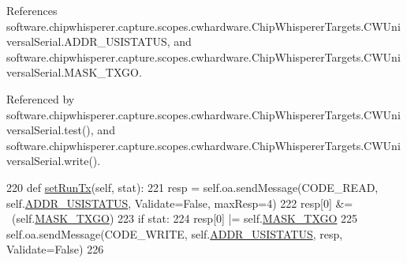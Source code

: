 References software.\+chipwhisperer.\+capture.\+scopes.\+cwhardware.\+Chip\+Whisperer\+Targets.\+C\+W\+Universal\+Serial.\+A\+D\+D\+R\+\_\+\+U\+S\+I\+S\+T\+A\+T\+U\+S, and software.\+chipwhisperer.\+capture.\+scopes.\+cwhardware.\+Chip\+Whisperer\+Targets.\+C\+W\+Universal\+Serial.\+M\+A\+S\+K\+\_\+\+T\+X\+G\+O.



Referenced by software.\+chipwhisperer.\+capture.\+scopes.\+cwhardware.\+Chip\+Whisperer\+Targets.\+C\+W\+Universal\+Serial.\+test(), and software.\+chipwhisperer.\+capture.\+scopes.\+cwhardware.\+Chip\+Whisperer\+Targets.\+C\+W\+Universal\+Serial.\+write().


\begin{DoxyCode}
220     \textcolor{keyword}{def }\hyperlink{classsoftware_1_1chipwhisperer_1_1capture_1_1scopes_1_1cwhardware_1_1ChipWhispererTargets_1_1CWUniversalSerial_a3088f280b5d288564a270a79764efced}{setRunTx}(self, stat):
221         resp = self.oa.sendMessage(CODE\_READ, self.\hyperlink{classsoftware_1_1chipwhisperer_1_1capture_1_1scopes_1_1cwhardware_1_1ChipWhispererTargets_1_1CWUniversalSerial_a6365eef9c1c87b5cf93d078ed43a1872}{ADDR\_USISTATUS}, Validate=\textcolor{keyword}{False}, maxResp=4)
222         resp[0] &= ~(self.\hyperlink{classsoftware_1_1chipwhisperer_1_1capture_1_1scopes_1_1cwhardware_1_1ChipWhispererTargets_1_1CWUniversalSerial_a18951a7e2a5757492b2dac93f25bbe22}{MASK\_TXGO})
223         \textcolor{keywordflow}{if} stat:
224             resp[0] |= self.\hyperlink{classsoftware_1_1chipwhisperer_1_1capture_1_1scopes_1_1cwhardware_1_1ChipWhispererTargets_1_1CWUniversalSerial_a18951a7e2a5757492b2dac93f25bbe22}{MASK\_TXGO}
225         self.oa.sendMessage(CODE\_WRITE, self.\hyperlink{classsoftware_1_1chipwhisperer_1_1capture_1_1scopes_1_1cwhardware_1_1ChipWhispererTargets_1_1CWUniversalSerial_a6365eef9c1c87b5cf93d078ed43a1872}{ADDR\_USISTATUS}, resp, Validate=\textcolor{keyword}{False}) 
226         
\end{DoxyCode}
\hypertarget{classsoftware_1_1chipwhisperer_1_1capture_1_1scopes_1_1cwhardware_1_1ChipWhispererTargets_1_1CWUniversalSerial_ab273b79a6654c5e1b31f3ea5664cbecd}{}
